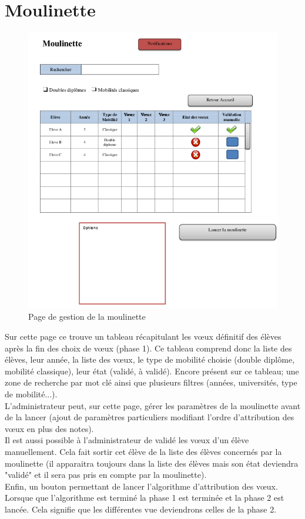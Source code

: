 \section{Moulinette}
\label{sec::moulinette}

\begin{figure}[H]
	\includegraphics[scale=0.7]{Admin/Moul.png}
	\caption{Page de gestion de la moulinette}
\end{figure}

Sur cette page ce trouve un tableau récapitulant les vœux définitif des élèves après la fin des choix de vœux (phase 1). Ce tableau comprend donc la liste des élèves, leur année, la liste des vœux, le type de mobilité choisie (double diplôme, mobilité classique), leur état (validé, à validé).
Encore présent sur ce tableau; une zone de recherche par mot clé ainsi que plusieurs filtres (années, universités, type de mobilité...).\\

L'administrateur peut, sur cette page, gérer les paramètres de la moulinette avant de la lancer (ajout de paramètres particuliers modifiant l'ordre d'attribution des vœux en plus des notes).\\

Il est aussi possible à l'administrateur de validé les vœux d'un élève manuellement. Cela fait sortir cet élève de la liste des élèves concernés par la moulinette (il apparaitra toujours dans la liste des élèves mais son état deviendra "validé" et il sera pas pris en compte par la moulinette).\\

Enfin, un bouton permettant de lancer l'algorithme d'attribution des vœux. Lorsque que l'algorithme est terminé la phase 1 est terminée et la phase 2 est lancée. Cela signifie que les différentes vue deviendrons celles de la phase 2.